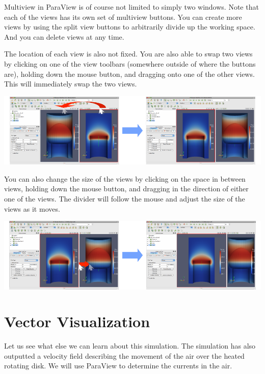 Multiview in ParaView is of course not limited to simply two windows.  Note
that each of the views has its own set of multiview buttons.  You can
create more views by using the split view buttons \splitViewH \splitViewV
to arbitrarily divide up the working space.  And you can delete views
\deleteView at any time.

The location of each view is also not fixed.  You are also able to swap two
views by clicking on one of the view toolbars (somewhere outside of where
the buttons are), holding down the mouse button, and dragging onto one of
the other views.  This will immediately swap the two views.

\begin{inlinefig}
  \includegraphics[width=\linewidth]{images/SwapViews}
\end{inlinefig}

You can also change the size of the views by clicking on the space in
between views, holding down the mouse button, and dragging in the direction
of either one of the views.  The divider will follow the mouse and adjust
the size of the views as it moves.

\begin{inlinefig}
  \includegraphics[width=\linewidth]{images/ResizeViews}
\end{inlinefig}


\section{Vector Visualization}

Let us see what else we can learn about this simulation.  The simulation
has also outputted a velocity field describing the movement of the air over
the heated rotating disk.  We will use ParaView to determine the currents
in the air.

